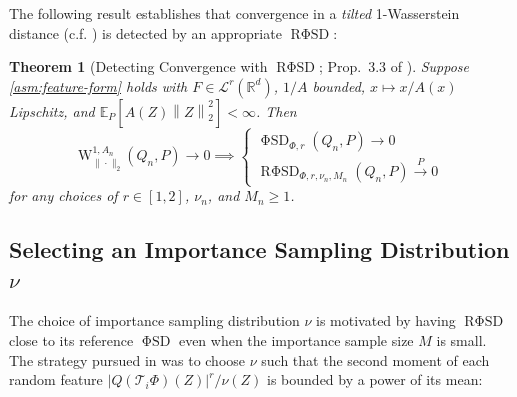 \documentclass[12pt,paper=letter]{scrreprt}
\newtheorem{theorem}{Theorem}[chapter]
\def\mbb#1{\mathbb{#1}}
\def\norm#1{\left\|{#1}\right\|} %
\newcommand{\twonorm}[1]{\norm{#1}_2} %
\def\E{\mbb{E}} %
\def\Esub#1{\E_{#1}}
\newcommand{\convP}{\overset{P}{\to}}
\newcommand{\feat}{\Phi} %
\newcommand{\FSD}{\ensuremath{\operatorname{\mathrm{\Phi}SD}}\xspace}
\newcommand{\RFSD}{\ensuremath{\operatorname{R\mathrm{\Phi}SD}}\xspace}
\newcommand{\isdist}{\nu}
\begin{document}
The following result establishes that convergence in a \emph{tilted} 1-Wasserstein distance (c.f. ) is detected by an appropriate $\RFSD$:

\begin{theorem}[Detecting Convergence with $\RFSD$; Prop.~3.3 of \citealp{huggins2018random}] \label{prop:KSD-upper-bound-for-FSD-and-RFSD}
Suppose \cref{asm:feature-form} holds with $F\in \mathcal{L}^r(\mathbb{R}^d)$, 
$1/A$ bounded, $x \mapsto x/A(x)$ Lipschitz,  and $\Esub{P}[{A}(Z) \twonorm{Z}^2] <\infty$.
Then 
$$
\mathrm{W}_{\|\cdot\|_2}^{1,A_n}(Q_n,P) \rightarrow 0 \implies \left\{ \begin{array}{l} \FSD_{\feat,r}(Q_n, P) \to 0 \\ \RFSD_{\feat,r,\isdist_n,M_n}(Q_n , P) \convP 0 \end{array} \right. 
$$
for any choices of $r\in[1,2]$, $\nu_n$, and $M_n \geq 1$.
\end{theorem}

\subsection{Selecting an Importance Sampling Distribution $\isdist$}
\label{sec:selecting-isdist}

The choice of importance sampling distribution $\nu$ is motivated by having $\RFSD$ close to its reference $\FSD$ even when the importance sample size $M$ is small. 
The strategy pursued in \citet{huggins2018random} was to choose $\nu$ such that the second moment of each random feature $|Q(\mathcal{T}_i \Phi)(Z)|^r / \nu(Z)$ is bounded by a
power of its mean:
\end{document}
